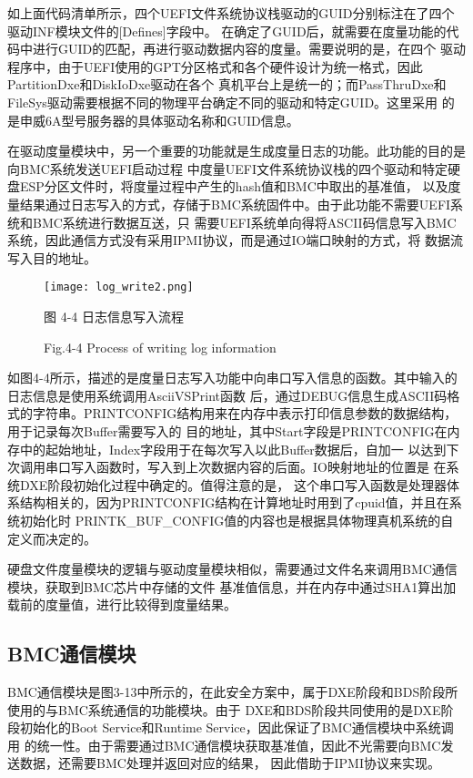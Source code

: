 如上面代码清单所示，四个UEFI文件系统协议栈驱动的GUID分别标注在了四个驱动INF模块文件的[Defines]字段中。
在确定了GUID后，就需要在度量功能的代码中进行GUID的匹配，再进行驱动数据内容的度量。需要说明的是，在四个
驱动程序中，由于UEFI使用的GPT分区格式和各个硬件设计为统一格式，因此PartitionDxe和DiskIoDxe驱动在各个
真机平台上是统一的；而PassThruDxe和FileSys驱动需要根据不同的物理平台确定不同的驱动和特定GUID。这里采用
的是申威6A型号服务器的具体驱动名称和GUID信息\cite{chinese7,addition2}。
\par 在驱动度量模块中，另一个重要的功能就是生成度量日志的功能。此功能的目的是向BMC系统发送UEFI启动过程
中度量UEFI文件系统协议栈的四个驱动和特定硬盘ESP分区文件时，将度量过程中产生的hash值和BMC中取出的基准值，
以及度量结果通过日志写入的方式，存储于BMC系统固件中。由于此功能不需要UEFI系统和BMC系统进行数据互送，只
需要UEFI系统单向得将ASCII码信息写入BMC系统，因此通信方式没有采用IPMI协议，而是通过IO端口映射的方式，将
数据流写入目的地址。

\begin{figure}[htb]
    \vspace{0cm}   
    \setlength{\abovecaptionskip}{0.3cm}
	\centering
    \texttt{[image: log\_write2.png]}
    \caption*{图 4-4 日志信息写入流程}
    \setlength{\belowcaptionskip}{-0.5cm}
    \caption*{Fig.4-4 Process of writing log information}
\end{figure}

如图4-4所示，描述的是度量日志写入功能中向串口写入信息的函数。其中输入的日志信息是使用系统调用AsciiVSPrint函数
后，通过DEBUG信息生成ASCII码格式的字符串。PRINTCONFIG结构用来在内存中表示打印信息参数的数据结构，用于记录每次Buffer需要写入的
目的地址，其中Start字段是PRINTCONFIG在内存中的起始地址，Index字段用于在每次写入以此Buffer数据后，自加一
以达到下次调用串口写入函数时，写入到上次数据内容的后面。IO映射地址的位置是
在系统DXE阶段初始化过程中确定的。值得注意的是，
这个串口写入函数是处理器体系结构相关的，因为PRINTCONFIG结构在计算地址时用到了cpuid值，并且在系统初始化时
PRINTK\_BUF\_CONFIG值的内容也是根据具体物理真机系统的自定义而决定的\cite{chinese13}。
\par 硬盘文件度量模块的逻辑与驱动度量模块相似，需要通过文件名来调用BMC通信模块，获取到BMC芯片中存储的文件
基准值信息，并在内存中通过SHA1算出加载前的度量值，进行比较得到度量结果。

\subsection{BMC通信模块}
BMC通信模块是图3-13中所示的，在此安全方案中，属于DXE阶段和BDS阶段所使用的与BMC系统通信的功能模块。由于
DXE和BDS阶段共同使用的是DXE阶段初始化的Boot Service和Runtime Service，因此保证了BMC通信模块中系统调用
的统一性。由于需要通过BMC通信模块获取基准值，因此不光需要向BMC发送数据，还需要BMC处理并返回对应的结果，
因此借助于IPMI协议来实现\cite{chinese26}。


